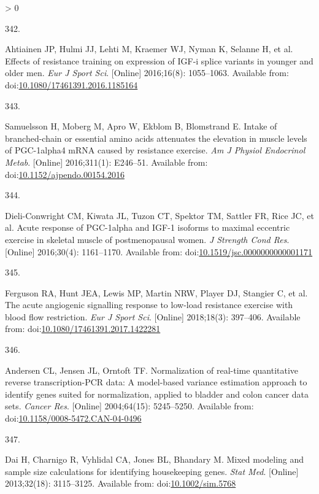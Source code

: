 \documentclass[twoside,10pt]{gihclass} %
\newlength{\cslhangindent}
\newlength{\csllabelwidth}
\newenvironment{CSLReferences}[3] %
 {%
  \setlength{\parindent}{0pt}
  \ifodd #1 \everypar{\setlength{\hangindent}{\cslhangindent}}\ignorespaces\fi
  \ifnum #2 > 0
  \setlength{\parskip}{#2\baselineskip}
  \fi
 }%
 {}
\newcommand{\CSLLeftMargin}[1]{\parbox[t]{\maxof{\widthof{#1}}{\csllabelwidth}}{#1}}
\newcommand{\CSLRightInline}[1]{\parbox[t]{\linewidth}{#1}}
\begin{document}
\begin{CSLReferences}{0}{0}
\leavevmode\hypertarget{ref-RN2083}{}%
\CSLLeftMargin{342. }
\CSLRightInline{Ahtiainen JP, Hulmi JJ, Lehti M, Kraemer WJ, Nyman K, Selanne H, et al. Effects of resistance training on expression of IGF-i splice variants in younger and older men. \emph{Eur J Sport Sci}. {[}Online{]} 2016;16(8): 1055--1063. Available from: doi:\href{https://doi.org/10.1080/17461391.2016.1185164}{10.1080/17461391.2016.1185164}}

\leavevmode\hypertarget{ref-RN2084}{}%
\CSLLeftMargin{343. }
\CSLRightInline{Samuelsson H, Moberg M, Apro W, Ekblom B, Blomstrand E. Intake of branched-chain or essential amino acids attenuates the elevation in muscle levels of PGC-1alpha4 mRNA caused by resistance exercise. \emph{Am J Physiol Endocrinol Metab}. {[}Online{]} 2016;311(1): E246--51. Available from: doi:\href{https://doi.org/10.1152/ajpendo.00154.2016}{10.1152/ajpendo.00154.2016}}

\leavevmode\hypertarget{ref-RN2086}{}%
\CSLLeftMargin{344. }
\CSLRightInline{Dieli-Conwright CM, Kiwata JL, Tuzon CT, Spektor TM, Sattler FR, Rice JC, et al. Acute response of PGC-1alpha and IGF-1 isoforms to maximal eccentric exercise in skeletal muscle of postmenopausal women. \emph{J Strength Cond Res}. {[}Online{]} 2016;30(4): 1161--1170. Available from: doi:\href{https://doi.org/10.1519/jsc.0000000000001171}{10.1519/jsc.0000000000001171}}

\leavevmode\hypertarget{ref-RN2087}{}%
\CSLLeftMargin{345. }
\CSLRightInline{Ferguson RA, Hunt JEA, Lewis MP, Martin NRW, Player DJ, Stangier C, et al. The acute angiogenic signalling response to low-load resistance exercise with blood flow restriction. \emph{Eur J Sport Sci}. {[}Online{]} 2018;18(3): 397--406. Available from: doi:\href{https://doi.org/10.1080/17461391.2017.1422281}{10.1080/17461391.2017.1422281}}

\leavevmode\hypertarget{ref-RN1772}{}%
\CSLLeftMargin{346. }
\CSLRightInline{Andersen CL, Jensen JL, Orntoft TF. Normalization of real-time quantitative reverse transcription-PCR data: A model-based variance estimation approach to identify genes suited for normalization, applied to bladder and colon cancer data sets. \emph{Cancer Res}. {[}Online{]} 2004;64(15): 5245--5250. Available from: doi:\href{https://doi.org/10.1158/0008-5472.CAN-04-0496}{10.1158/0008-5472.CAN-04-0496}}

\leavevmode\hypertarget{ref-RN1771}{}%
\CSLLeftMargin{347. }
\CSLRightInline{Dai H, Charnigo R, Vyhlidal CA, Jones BL, Bhandary M. Mixed modeling and sample size calculations for identifying housekeeping genes. \emph{Stat Med}. {[}Online{]} 2013;32(18): 3115--3125. Available from: doi:\href{https://doi.org/10.1002/sim.5768}{10.1002/sim.5768}}


\end{CSLReferences}
\end{document}

